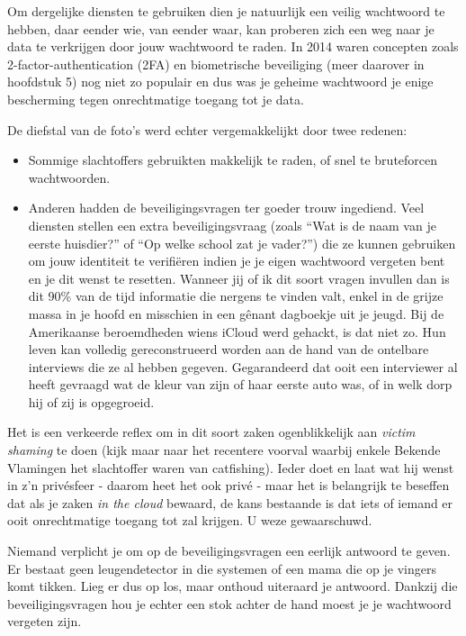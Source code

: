 \documentclass[
  10pt,
  dutch,
  paper=a4,
  ,captions=tableheading
]{scrbook}
\providecommand{\tightlist}{%
  \setlength{\itemsep}{0pt}\setlength{\parskip}{0pt}}
\begin{document}
Om dergelijke diensten te gebruiken dien je natuurlijk een veilig
wachtwoord te hebben, daar eender wie, van eender waar, kan proberen
zich een weg naar je data te verkrijgen door jouw wachtwoord te raden.
In 2014 waren concepten zoals 2-factor-authentication (2FA) en
biometrische beveiliging (meer daarover in hoofdstuk 5) nog niet zo
populair en dus was je geheime wachtwoord je enige bescherming tegen
onrechtmatige toegang tot je data.

De diefstal van de foto's werd echter vergemakkelijkt door twee redenen:

\begin{itemize}
\tightlist
\item
  Sommige slachtoffers gebruikten makkelijk te raden, of snel te
  bruteforcen wachtwoorden.
\item
  Anderen hadden de beveiligingsvragen ter goeder trouw ingediend. Veel
  diensten stellen een extra beveiligingsvraag (zoals ``Wat is de naam
  van je eerste huisdier?'' of ``Op welke school zat je vader?'') die ze
  kunnen gebruiken om jouw identiteit te verifiëren indien je je eigen
  wachtwoord vergeten bent en je dit wenst te resetten. Wanneer jij of
  ik dit soort vragen invullen dan is dit 90\% van de tijd informatie
  die nergens te vinden valt, enkel in de grijze massa in je hoofd en
  misschien in een gênant dagboekje uit je jeugd. Bij de Amerikaanse
  beroemdheden wiens iCloud werd gehackt, is dat niet zo. Hun leven kan
  volledig gereconstrueerd worden aan de hand van de ontelbare
  interviews die ze al hebben gegeven. Gegarandeerd dat ooit een
  interviewer al heeft gevraagd wat de kleur van zijn of haar eerste
  auto was, of in welk dorp hij of zij is opgegroeid.
\end{itemize}

\begin{warningblock}
Het is een verkeerde reflex om in dit soort zaken ogenblikkelijk aan
\emph{victim shaming} te doen (kijk maar naar het recentere voorval
waarbij enkele Bekende Vlamingen het slachtoffer waren van catfishing).
Ieder doet en laat wat hij wenst in z'n privésfeer - daarom heet het ook
privé - maar het is belangrijk te beseffen dat als je zaken \emph{in the
cloud} bewaard, de kans bestaande is dat iets of iemand er ooit
onrechtmatige toegang tot zal krijgen. U weze gewaarschuwd.
\end{warningblock}

\begin{tipblock}
Niemand verplicht je om op de beveiligingsvragen een eerlijk antwoord te
geven. Er bestaat geen leugendetector in die systemen of een mama die op
je vingers komt tikken. Lieg er dus op los, maar onthoud uiteraard je
antwoord. Dankzij die beveiligingsvragen hou je echter een stok achter
de hand moest je je wachtwoord vergeten zijn.
\end{tipblock}
\end{document}

